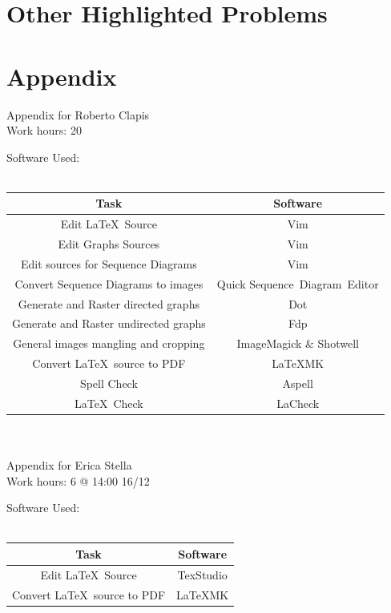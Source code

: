 \documentclass{article}
\begin{document}
\section{Other Highlighted Problems}

\section{Appendix}
Appendix for Roberto Clapis\\
Work hours: 20
\begin{center}
	Software Used:\\
	\-\\
	\begin{tabular}{*{2}{c}}
		\toprule
		Task & Software \\
		\midrule
		Edit \LaTeX\ Source & Vim\\
		Edit Graphs Sources & Vim\\
		Edit sources for Sequence Diagrams & Vim\\
		Convert Sequence Diagrams to images & Quick Sequence Diagram Editor\\
		Generate and Raster directed graphs& Dot\\
		Generate and Raster undirected graphs& Fdp\\
		General images mangling and cropping & ImageMagick \& Shotwell\\
		Convert \LaTeX\ source to PDF & \LaTeX\-MK\\
		Spell Check & Aspell \\
		\LaTeX\ Check & LaCheck\\
		\bottomrule
	\end{tabular}
\end{center}
\-\\
\-\\
Appendix for Erica Stella\\
Work hours: 6 @ 14:00 16/12
\begin{center}
	Software Used:\\
	\-\\
	\begin{tabular}{*{2}{c}}
		\toprule
		Task & Software \\
		\midrule
		Edit \LaTeX\ Source & TexStudio\\
		Convert \LaTeX\ source to PDF & \LaTeX\-MK\\
		\bottomrule
	\end{tabular}
\end{center}
\end{document}
